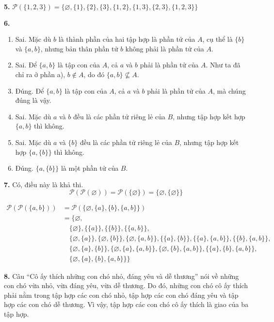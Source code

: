 \documentclass[12pt,a4paper]{article}
\theoremstyle{definition}
\begin{document}
\bigskip
\textbf{5.} $\mathcal{P}(\{1, 2, 3\}) = \{\varnothing, \{1\}, \{2\}, \{3\}, \{1, 2\}, \{1, 3\}, \{2, 3\}, \{1, 2, 3\}\}$

\bigskip
\textbf{6.}
\begin{enumerate}[label=\textbf{\alph*)}]
\item Sai. Mặc dù $b$ là thành phần của hai tập hợp là phần tử của $A$, cụ thể là $\{b\}$ và $\{a, b\}$, nhưng bản thân phần tử $b$ không phải là phần tử của $A$.
\item Sai. Để $\{a, b\}$ là tập con của $A$, cả $a$ và $b$ phải là phần tử của $A$. Như ta đã chỉ ra ở phần a), $b \notin A$, do đó $\{a, b\} \not\subseteq A$.
\item Đúng. Để $\{a, b\}$ là tập con của $A$, cả $a$ và $b$ phải là phần tử của $A$, mà chúng đúng là vậy.
\item Sai. Mặc dù $a$ và $b$ đều là các phần tử riêng lẻ của $B$, nhưng tập hợp kết hợp $\{a, b\}$ thì không.
\item Sai. Mặc dù $a$ và $\{b\}$ đều là các phần tử riêng lẻ của $B$, nhưng tập hợp kết hợp $\{a, \{b\}\}$ thì không.
\item Đúng. $\{a, \{b\}\}$ là một phần tử của $B$.
\end{enumerate}

\bigskip
\textbf{7.} Có, điều này là khả thi.
\[\mathcal{P}(\mathcal{P}(\varnothing)) = \mathcal{P}(\{\varnothing\}) = \{\varnothing, \{\varnothing\}\}\]

\begin{align*}
\mathcal{P}(\mathcal{P}(\{a, b\})) &= \mathcal{P}(\{\varnothing, \{a\}, \{b\}, \{a, b\}\}) \\
&= \{\varnothing, \\
&\quad \{\varnothing\}, \{\{a\}\}, \{\{b\}\}, \{\{a, b\}\}, \\
&\quad \{\varnothing, \{a\}\}, \{\varnothing, \{b\}\}, \{\varnothing, \{a, b\}\}, \{\{a\}, \{b\}\}, \{\{a\}, \{a, b\}\}, \{\{b\}, \{a, b\}\}, \\
&\quad \{\varnothing, \{a\}, \{b\}\}, \{\varnothing, \{a\}, \{a, b\}\}, \{\varnothing, \{b\}, \{a, b\}\}, \{\{a\}, \{b\}, \{a, b\}\}, \\
&\quad \{\varnothing, \{a\}, \{b\}, \{a, b\}\}\}
\end{align*}

\bigskip
\textbf{8.} Câu ``Cô ấy thích những con chó nhỏ, đáng yêu và dễ thương'' nói về những con chó vừa nhỏ, vừa đáng yêu, vừa dễ thương. Do đó, những con chó cô ấy thích phải nằm trong tập hợp các con chó nhỏ, tập hợp các con chó đáng yêu và tập hợp các con chó dễ thương. Vì vậy, tập hợp các con chó cô ấy thích là giao của ba tập hợp.
\end{document}
